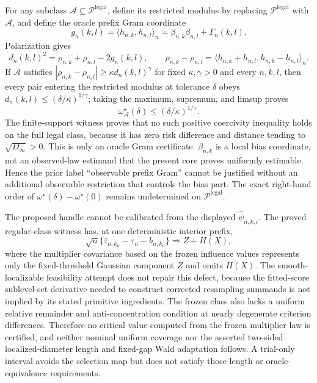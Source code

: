 For any subclass \(\mathcal A\subseteq\mathcal P^{\mathrm{legal}}\), define its restricted modulus by replacing \(\mathcal P^{\mathrm{legal}}\) with \(\mathcal A\), and define the oracle prefix Gram coordinate
\[
 g_n(k,l)=\langle h_{n,k},h_{n,l}\rangle_n
 =\beta_{n,k}\beta_{n,l}+\Gamma_n(k,l).
\]
Polarization gives
\[
 d_n(k,l)^2=\rho_{n,k}+\rho_{n,l}-2g_n(k,l),
 \qquad
 \rho_{n,k}-\rho_{n,l}
 =\langle h_{n,k}+h_{n,l},h_{n,k}-h_{n,l}\rangle_n.
\]
If \(\mathcal A\) satisfies \(|\rho_{n,k}-\rho_{n,l}|\geq\kappa d_n(k,l)^\gamma\) for fixed \(\kappa,\gamma>0\) and every \(n,k,l\), then every pair entering the restricted modulus at tolerance \(\delta\) obeys \(d_n(k,l)\leq(\delta/\kappa)^{1/\gamma}\); taking the maximum, supremum, and limsup proves
\[
 \omega_{\mathcal A}^{\star}(\delta)
 \leq(\delta/\kappa)^{1/\gamma}.
\]
The finite-support witness proves that no such positive coercivity inequality holds on the full legal class, because it has zero risk difference and distance tending to \(\sqrt{D_\infty}>0\).  This is only an oracle Gram certificate: \(\beta_{n,k}\) is a local bias coordinate, not an observed-law estimand that the present core proves uniformly estimable.  Hence the prior label ``observable prefix Gram'' cannot be justified without an additional observable restriction that controls the bias part.  The exact right-hand order of \(\omega^{\star}(\delta)-\omega^{\star}(0)\) remains undetermined on \(\mathcal P^{\mathrm{legal}}\).

The proposed handle cannot be calibrated from the displayed \(\widehat\psi_{n,k,i}\).  The proved regular-class witness has, at one deterministic interior prefix,
\[
 \sqrt n\{\widehat\tau_{n,k_n}-\tau_n-b_{n,k_n}\}
 \Rightarrow Z+H(X),
\]
where the multiplier covariance based on the frozen influence values represents only the fixed-threshold Gaussian component \(Z\) and omits \(H(X)\).  The smooth-localizable feasibility attempt does not repair this defect, because the fitted-score sublevel-set derivative needed to construct corrected resampling summands is not implied by its stated primitive ingredients.  The frozen class also lacks a uniform relative remainder and anti-concentration condition at nearly degenerate criterion differences.  Therefore no critical value computed from the frozen multiplier law is certified, and neither nominal uniform coverage nor the asserted two-sided localized-diameter length and fixed-gap Wald adaptation follows.  A trial-only interval avoids the selection map but does not satisfy those length or oracle-equivalence requirements.
